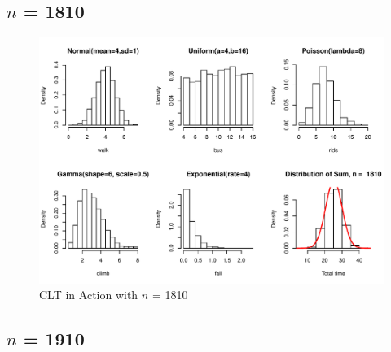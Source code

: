 \documentclass[11pt,letter]{article}\usepackage[]{graphicx}\usepackage[]{color}
\makeatletter
\def\maxwidth{ %
  \ifdim\Gin@nat@width>\linewidth
    \linewidth
  \else
    \Gin@nat@width
  \fi
}
\newenvironment{knitrout}{}{} %
\makeatother
\begin{document}
\subsection{$n$ = 1810}

\begin{knitrout}
\color{fgcolor}\begin{figure}[h]

{\centering \includegraphics[width=\maxwidth]{figure/n-1810-1} 

}

\caption[CLT in Action with ]{CLT in Action with $n$ = 1810}\label{fig:n-1810}
\end{figure}


\end{knitrout}
\newpage
\subsection{$n$ = 1910}
\end{document}
